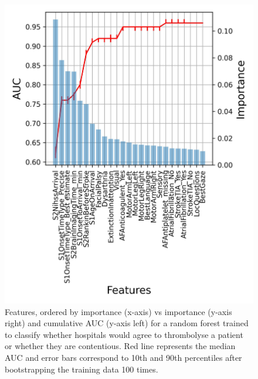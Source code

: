 \documentclass[12pt,a4paper, pdftex]{elsarticle}
\begin{document}
\begin{figure}[ht!!!]
\centering
\includegraphics[width=15cm]{figures/auc_features.jpg}
\caption{Features, ordered by importance (x-axis) vs importance (y-axis right) and cumulative AUC (y-axis left) for a random forest trained to classify whether hospitals would agree to thrombolyse a patient or whether they are contentious. Red line represents the median AUC and error bars correspond to 10th and 90th percentiles after bootstrapping the training data 100 times.}
\label{fig:auc_features}
\end{figure}
\end{document}
